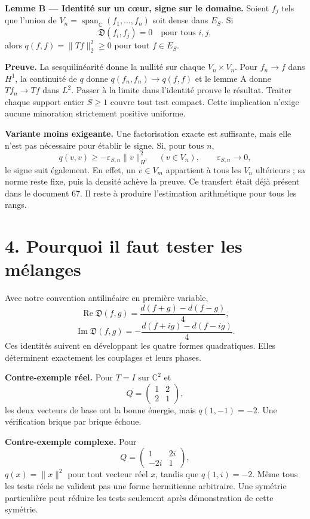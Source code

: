 \documentclass[
  11pt,
]{article}
\begin{document}
\textbf{Lemme B --- Identité sur un cœur, signe sur le domaine.} Soient
\(f_j\) tels que l'union de
\(V_n=\operatorname{span}_{\mathbb C}(f_1,\ldots,f_n)\) soit dense dans
\(E_S\). Si \[
\mathfrak D(f_i,f_j)=0\quad\text{pour tous }i,j,
\] alors \(q(f,f)=\|Tf\|_2^2\ge0\) pour tout \(f\in E_S\).

\textbf{Preuve.} La sesquilinéarité donne la nullité sur chaque
\(V_n\times V_n\). Pour \(f_n\to f\) dans \(H^1\), la continuité de
\(q\) donne \(q(f_n,f_n)\to q(f,f)\) et le lemme A donne \(Tf_n\to Tf\)
dans \(L^2\). Passer à la limite dans l'identité prouve le résultat.
Traiter chaque support entier \(S\ge1\) couvre tout test compact. Cette
implication n'exige aucune minoration strictement positive uniforme.

\textbf{Variante moins exigeante.} Une factorisation exacte est
suffisante, mais elle n'est pas nécessaire pour établir le signe. Si,
pour tous \(n\), \[
q(v,v)\ge-\varepsilon_{S,n}\|v\|_{H^1}^2
\quad(v\in V_n),\qquad\varepsilon_{S,n}\longrightarrow0,
\] le signe suit également. En effet, un \(v\in V_m\) appartient à tous
les \(V_n\) ultérieurs ; sa norme reste fixe, puis la densité achève la
preuve. Ce transfert était déjà présent dans le document 67. Il reste à
produire l'estimation arithmétique pour tous les rangs.

\hypertarget{pourquoi-il-faut-tester-les-muxe9langes}{%
\section{4. Pourquoi il faut tester les
mélanges}\label{pourquoi-il-faut-tester-les-muxe9langes}}

Avec notre convention antilinéaire en première variable, \[
\operatorname{Re}\mathfrak D(f,g)
=\frac{d(f+g)-d(f-g)}4,
\] \[
\operatorname{Im}\mathfrak D(f,g)
=-\frac{d(f+ig)-d(f-ig)}4.
\] Ces identités suivent en développant les quatre formes quadratiques.
Elles déterminent exactement les couplages et leurs phases.

\textbf{Contre-exemple réel.} Pour \(T=I\) sur \(\mathbb C^2\) et \[
Q=\begin{pmatrix}1&2\\2&1\end{pmatrix},
\] les deux vecteurs de base ont la bonne énergie, mais \(q(1,-1)=-2\).
Une vérification brique par brique échoue.

\textbf{Contre-exemple complexe.} Pour \[
Q=\begin{pmatrix}1&2i\\-2i&1\end{pmatrix},
\] \(q(x)=\|x\|^2\) pour tout vecteur réel \(x\), tandis que
\(q(1,i)=-2\). Même tous les tests réels ne valident pas une forme
hermitienne arbitraire. Une symétrie particulière peut réduire les tests
seulement après démonstration de cette symétrie.
\end{document}
